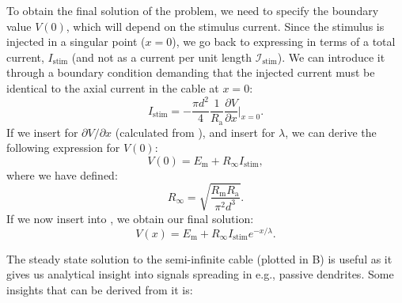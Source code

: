 To obtain the final solution of the problem, we need to specify the boundary value $V(0)$, which will depend on the stimulus current. Since the stimulus is injected in a singular point ($x=0$), we go back to expressing in terms of a total current, $I_\text{stim}$ (and not as a current per unit length $\mathcal{I}_\text{stim}$). We can introduce it through a boundary condition demanding that the injected current must be identical to the axial current in the cable at $x=0$:
\begin{equation}
I_\text{stim} = - \frac{\pi d^2}{4}\frac{1}{R_\text{a}} \frac{\partial V}{\partial x}   \Big|_{x=0}.
\end{equation}
If we insert for $\partial V/\partial x$ (calculated from ), and insert  for $\lambda$, we can derive the following expression for $V(0)$:
\begin{equation}
V(0) = E_\text{m} + R_{\infty}I_\text{stim}, 
\label{eq:Neuron:firstRinf}
\end{equation}
where we have defined:
\begin{equation}
R_{\infty} = \sqrt{\frac{R_\text{m} R_\text{a}}{\pi^2 d^3}}.
\label{eq:Neuron:Rinf}
\end{equation}
If we now insert  into , we obtain our final solution:
\begin{equation}
V(x) = E_\text{m} +R_{\infty}I_\text{stim}  e^{-x/\lambda}.
\label{eq:Neuron:semiinf4}
\end{equation}

The steady state solution to the semi-infinite cable (plotted in B) is useful as it gives us analytical insight into signals spreading in e.g., passive dendrites. Some insights that can be derived from it is:

